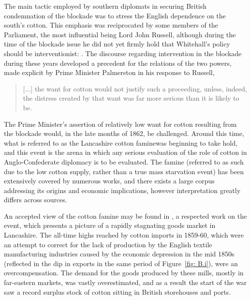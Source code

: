 The main tactic employed by southern diplomats in securing British condemnation of the blockade was to stress the English dependence
on the south's cotton. This emphasis was reciprocated by some members of the Parliament, the most influential being Lord John Russell, although
during the time of the blockade issue he did not yet firmly hold that Whitehall's policy should be interventionist: . \autocite[Russell $\rightarrow$ Palmerston, quoted in][Vol.I, p.199. There are two possible readings of what Russell said here, resting on one's interpretation of the phrase "It will not do". I have chosen to understand it, as I believe fits most reasonably within the context of the quote, as indicative of Russell's reservations regarding the breaking of the blockade, rather than a feeling that this action does not go far enough.]{adamsBritainAmericanWar1925}
The discourse regarding intervention in the blockade during these years developed a precedent for the relations of the two powers, made explicit by Prime Minister
Palmerston in his response to Russell,
\begin{quote}
  [...] the want for cotton would not justify such a proceeding, unless, indeed, the distress created by that want was far more serious than it is likely to be.
  \Autocite[Palmerston $\rightarrow$ Russell, quoted in][Vol.I, p.199]{adamsBritainAmericanWar1925}
\end{quote}

\hfill

The Prime Minister's assertion of relatively low want for cotton resulting from the blockade would, in the late months of 1862, be challenged. Around this time,
what is referred to as the \flq Lancashire cotton famine\frq was beginning to take hold, and this event is the arena in which any serious evaluation
of the role of cotton in Anglo-Confederate diplomacy is to be evaluated. The famine (referred to as such due to the low cotton supply, rather than
a true mass starvation event) has been extensively covered by numerous works, and there exists a large corpus addressing its origins and
economic implications, however interpretation greatly differs across sources.

An accepted view of the cotton famine may be found in , a respected work on the event, which
presents a picture of a rapidly stagnating goods market in Lancashire\autocite[78]{arnoldHistoryCotton1864}. The all-time highs reached by cotton imports
in 1859-60, which were an attempt to correct for the lack of production by the English textile manufacturing industries caused by the
economic depression in the mid 1850s (reflected in the dip in exports in the same period of Figure~\ref{fig: B.i}), were an
overcompensation. The demand for the goods produced by these mills, mostly in far-eastern markets, was vastly overestimated, and as a result
the start of the war saw a record surplus stock of cotton sitting in British storehouses and ports.


